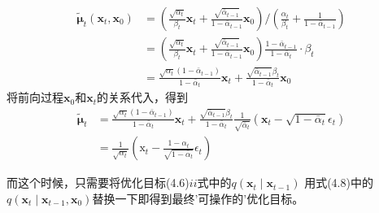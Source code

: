\begin{equation}
\begin{aligned}
\tilde{\boldsymbol{\mu}}_t\left(\mathbf{x}_t, \mathbf{x}_0\right) & =\left(\frac{\sqrt{\alpha_t}}{\beta_t} \mathbf{x}_t+\frac{\sqrt{\bar{\alpha}_{t-1}}}{1-\bar{\alpha}_{t-1}} \mathbf{x}_0\right) /\left(\frac{\alpha_t}{\beta_t}+\frac{1}{1-\bar{\alpha}_{t-1}}\right) \\
& =\left(\frac{\sqrt{\alpha_t}}{\beta_t} \mathbf{x}_t+\frac{\sqrt{\bar{\alpha}_{t-1}}}{1-\bar{\alpha}_{t-1}} \mathbf{x}_0\right) \frac{1-\bar{\alpha}_{t-1}}{1-\bar{\alpha}_t} \cdot \beta_t \\
& =\frac{\sqrt{\alpha_t}\left(1-\bar{\alpha}_{t-1}\right)}{1-\bar{\alpha}_t} \mathbf{x}_t+\frac{\sqrt{\bar{\alpha}_{t-1}} \beta_t}{1-\bar{\alpha}_t} \mathbf{x}_0
\end{aligned}
\end{equation}
将前向过程$\mathbf{x}_0$和$\mathbf{x}_t$的关系代入，得到
\begin{equation}
\begin{aligned}
\tilde{\boldsymbol{\mu}}_t & =\frac{\sqrt{\alpha_t}\left(1-\bar{\alpha}_{t-1}\right)}{1-\bar{\alpha}_t} \mathbf{x}_t+\frac{\sqrt{\bar{\alpha}_{t-1}} \beta_t}{1-\bar{\alpha}_t} \frac{1}{\sqrt{\bar{\alpha}_t}}\left(\mathbf{x}_t-\sqrt{1-\bar{\alpha}_t} \epsilon_t\right) \\
& =\frac{1}{\sqrt{\alpha_t}}\left(\mathrm{x}_t-\frac{1-\alpha_t}{\sqrt{1-\bar{\alpha}_t}} \epsilon_t\right)
\end{aligned}
\end{equation}

而这个时候，只需要将优化目标(4.6)$ii$式中的$q(\mathbf{x}_t \mid \mathbf{x}_{t-1})$
用式(4.8)中的$q(\mathbf{x}_t \mid \mathbf{x}_{t-1},\mathbf{x}_0)$替换一下即得到最终'可操作的'优化目标。

